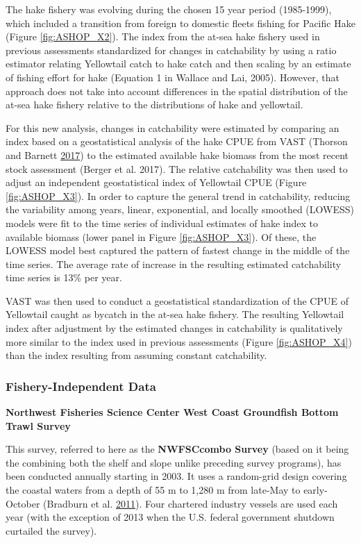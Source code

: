\documentclass[12pt,]{article}
\begin{document}
The hake fishery was evolving during the chosen 15 year period
(1985-1999), which included a transition from foreign to domestic fleets
fishing for Pacific Hake (Figure \ref{fig:ASHOP_X2}). The index from the
at-sea hake fishery used in previous assessments standardized for
changes in catchability by using a ratio estimator relating Yellowtail
catch to hake catch and then scaling by an estimate of fishing effort
for hake (Equation 1 in Wallace and Lai, 2005). However, that approach
does not take into account differences in the spatial distribution of
the at-sea hake fishery relative to the distributions of hake and
yellowtail.

For this new analysis, changes in catchability were estimated by
comparing an index based on a geostatistical analysis of the hake CPUE
from VAST (Thorson and Barnett
\protect\hyperlink{ref-Thorson2017}{2017}) to the estimated available
hake biomass from the most recent stock assessment (Berger et al. 2017).
The relative catchability was then used to adjust an independent
geostatistical index of Yellowtail CPUE (Figure \ref{fig:ASHOP_X3}). In
order to capture the general trend in catchability, reducing the
variability among years, linear, exponential, and locally smoothed
(LOWESS) models were fit to the time series of individual estimates of
hake index to available biomass (lower panel in Figure
\ref{fig:ASHOP_X3}). Of these, the LOWESS model best captured the
pattern of fastest change in the middle of the time series. The average
rate of increase in the resulting estimated catchability time series is
13\% per year.

VAST was then used to conduct a geostatistical standardization of the
CPUE of Yellowtail caught as bycatch in the at-sea hake fishery. The
resulting Yellowtail index after adjustment by the estimated changes in
catchability is qualitatively more similar to the index used in previous
assessments (Figure \ref{fig:ASHOP_X4}) than the index resulting from
assuming constant catchability.

\subsubsection{Fishery-Independent Data}\label{fishery-independent-data}

\textbf{Northwest Fisheries Science Center West Coast Groundfish Bottom
Trawl Survey}

This survey, referred to here as the \textbf{NWFSCcombo Survey} (based
on it being the combining both the shelf and slope unlike preceding
survey programs), has been conducted annually starting in 2003. It uses
a random-grid design covering the coastal waters from a depth of 55 m to
1,280 m from late-May to early-October (Bradburn et al.
\protect\hyperlink{ref-Bradburn2011}{2011}). Four chartered industry
vessels are used each year (with the exception of 2013 when the U.S.
federal government shutdown curtailed the survey).
\end{document}
